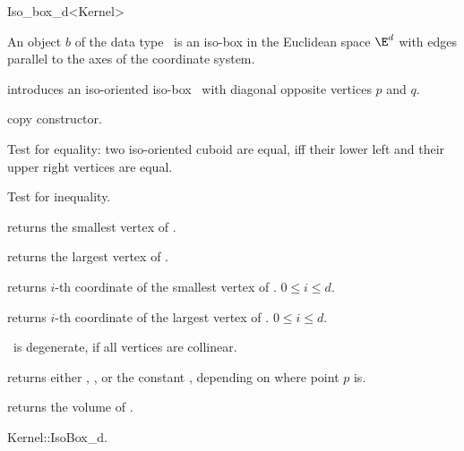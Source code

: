 \begin{ccRefClass} {Iso_box_d<Kernel>}

\ccDefinition  An object $b$ of the data type \ccRefName\ is an
iso-box in the Euclidean space $\E^d$ with edges parallel to the 
axes of the coordinate system.
 
\ccCreation
{}

            {introduces an iso-oriented iso-box \ccVar\ with diagonal
             opposite vertices $p$ and $q$. 
}

\ccHidden {}
            {copy constructor.}

\ccOperations

       {Test for equality: two iso-oriented cuboid are equal, iff their
        lower left and their upper right vertices are equal.}

       {Test for inequality.}


       {returns the smallest vertex of \ccVar.}


       {returns the largest vertex of \ccVar.}


         {returns $i$-th  coordinate of
          the smallest vertex of \ccVar. 
          \ccPrecond $0 \leq i \leq d$.}

         {returns $i$-th  coordinate of
          the largest vertex of \ccVar. 
          \ccPrecond $0 \leq i \leq d$.}

\ccPredicates

       {%
        \ccVar\ is degenerate, if all vertices
        are collinear.}

       {returns either ,
        , or the constant
        , 
        depending on where point $p$ is.}

       {}
\ccGlue
{}
       {}
\ccGlue
{}
       {}


       {returns the volume of \ccVar. }

\ccSeeAlso
Kernel::IsoBox\_d. \\

\end{ccRefClass} 
